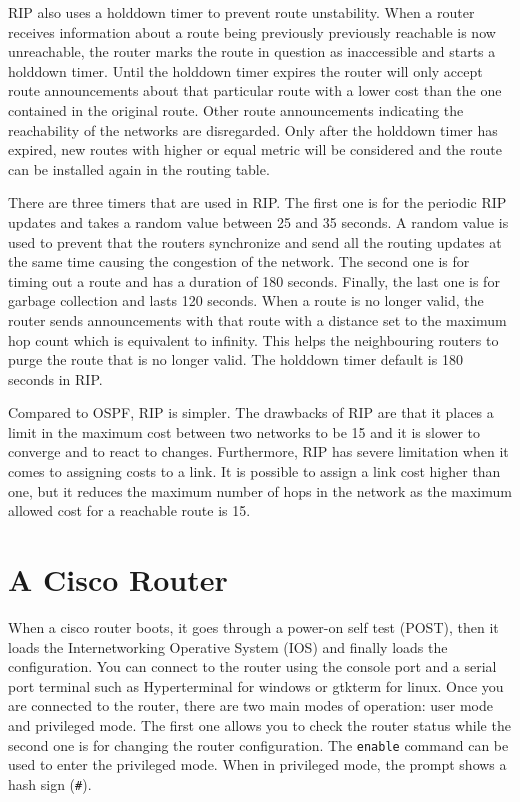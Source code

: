 RIP also uses a holddown timer to prevent route unstability. 
When a router receives information about a route being previously previously reachable is now unreachable, the router marks the route in question as inaccessible and starts a holddown timer.
Until the holddown timer expires the router will only accept route announcements about that particular route with a lower cost than the one contained in the original route.
Other route announcements indicating the reachability of the networks are disregarded.
Only after the holddown timer has expired, new routes with higher or equal metric will be considered and the route can be installed again in the routing table.

There are three timers that are used in RIP.
The first one is for the periodic RIP updates and takes a random value between 25 and 35 seconds.
A random value is used to prevent that the routers synchronize and send all the routing updates at the same time causing the congestion of the network.
The second one is for timing out a route and has a duration of 180 seconds.
Finally, the last one is for garbage collection and lasts 120 seconds.
When a route is no longer valid, the router sends announcements with that route with a distance set to the maximum hop count which is equivalent to infinity.
This helps the neighbouring routers to purge the route that is no longer valid.
The holddown timer default is 180 seconds in RIP.

Compared to OSPF, RIP is simpler.
The drawbacks of RIP are that it places a limit in the maximum cost between two networks to be 15 and it is slower to converge and to react to changes.
Furthermore, RIP has severe limitation when it comes to assigning costs to a link.
It is possible to assign a link cost higher than one, but it reduces the maximum number of hops in the network as the maximum allowed cost for a reachable route is 15.

\section{A Cisco Router}

When a cisco router boots, it goes through a power-on self test (POST), then it loads the Internetworking Operative System (IOS) and finally loads the configuration.
You can connect to the router using the console port and a serial port terminal such as Hyperterminal for windows or gtkterm for linux.
Once you are connected to the router, there are two main modes of operation: user mode and privileged mode.
The first one allows you to check the router status while the second one is for changing the router configuration.
The \texttt{enable} command can be used to enter the privileged mode.
When in privileged mode, the prompt shows a hash sign (\texttt{\#}).

